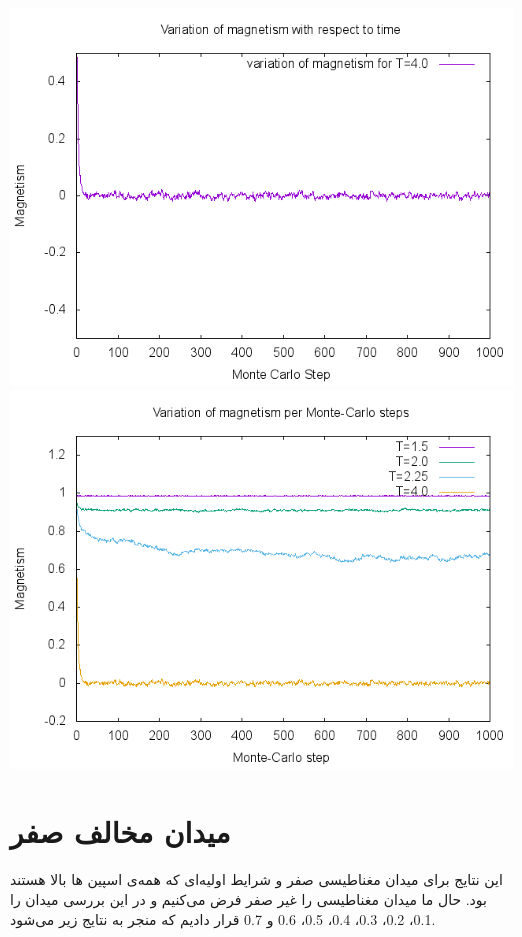 \documentclass[a4paper,12pt]{article}
\begin{document}
\begin{center}
\includegraphics[scale=.8]{40A.png}
\includegraphics[scale=.8]{0A.png}
\end{center}
\section{میدان مخالف صفر}
این نتایج برای میدان مغناطیسی صفر و شرایط اولیه‌ای که همه‌ی
اسپین ها بالا هستند بود.
حال ما میدان مغناطیسی را غیر صفر فرض می‌کنیم
و در این بررسی میدان را  0.1، 0.2، 0.3، 0.4، 0.5، 0.6 و 0.7
قرار دادیم که منجر به نتایج زیر می‌شود.
\end{document}

